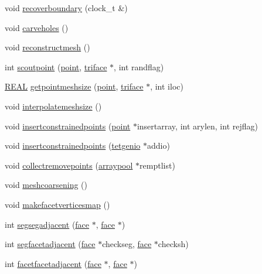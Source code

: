 \begin{DoxyCompactItemize}
\item 
void \hyperlink{classtetgenmesh_a1be7dce56688fbe7a97fc31f98b61c19}{recoverboundary} (clock\-\_\-t \&)
\item 
void \hyperlink{classtetgenmesh_ad71017c71bd2cac0232c410a651ed085}{carveholes} ()
\item 
void \hyperlink{classtetgenmesh_ad44b2ea3720da385a0cbcf306884e126}{reconstructmesh} ()
\item 
int \hyperlink{classtetgenmesh_a230d03da7e72e7092f5f51886806dd9b}{scoutpoint} (\hyperlink{classtetgenmesh_ace3fb4f80389185b7c9b18ab69a3dea2}{point}, \hyperlink{classtetgenmesh_1_1triface}{triface} $\ast$, int randflag)
\item 
\hyperlink{tetgen_8h_a4b654506f18b8bfd61ad2a29a7e38c25}{R\-E\-A\-L} \hyperlink{classtetgenmesh_a88f9f3b6bb6fb16418d028dd7d920ad0}{getpointmeshsize} (\hyperlink{classtetgenmesh_ace3fb4f80389185b7c9b18ab69a3dea2}{point}, \hyperlink{classtetgenmesh_1_1triface}{triface} $\ast$, int iloc)
\item 
void \hyperlink{classtetgenmesh_a78dbc1dcd69c15ee0f7f226be1078008}{interpolatemeshsize} ()
\item 
void \hyperlink{classtetgenmesh_ac8205cae8e16f490b80d74975934ff74}{insertconstrainedpoints} (\hyperlink{classtetgenmesh_ace3fb4f80389185b7c9b18ab69a3dea2}{point} $\ast$insertarray, int arylen, int rejflag)
\item 
void \hyperlink{classtetgenmesh_ab859365ca3dd3eafb77fac56d0ae3a03}{insertconstrainedpoints} (\hyperlink{classtetgenio}{tetgenio} $\ast$addio)
\item 
void \hyperlink{classtetgenmesh_add13a24cf325595ef693dca96f81470c}{collectremovepoints} (\hyperlink{classtetgenmesh_1_1arraypool}{arraypool} $\ast$remptlist)
\item 
void \hyperlink{classtetgenmesh_a85e17b620820cbcb6cb47b565f822062}{meshcoarsening} ()
\item 
void \hyperlink{classtetgenmesh_afa650c7021f3c73cf786d3f7fa687ed7}{makefacetverticesmap} ()
\item 
int \hyperlink{classtetgenmesh_a15f22ccbe981fc0d0eb4342a3c75d515}{segsegadjacent} (\hyperlink{classtetgenmesh_1_1face}{face} $\ast$, \hyperlink{classtetgenmesh_1_1face}{face} $\ast$)
\item 
int \hyperlink{classtetgenmesh_adf193bbe36f5075b209f0d71fc74a18b}{segfacetadjacent} (\hyperlink{classtetgenmesh_1_1face}{face} $\ast$checkseg, \hyperlink{classtetgenmesh_1_1face}{face} $\ast$checksh)
\item 
int \hyperlink{classtetgenmesh_a60303418c35324c87dfa1fcb3b160708}{facetfacetadjacent} (\hyperlink{classtetgenmesh_1_1face}{face} $\ast$, \hyperlink{classtetgenmesh_1_1face}{face} $\ast$)

\end{DoxyCompactItemize}
